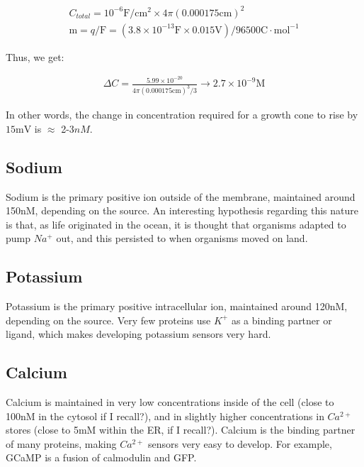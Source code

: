 \documentclass[12pt]{amsart}
\begin{document}
\bigskip

\begin{equation} \label{eq8}
\begin{split}
C_{total} = 10^{-6} \mathrm{F}/\mathrm{cm}^2 \times 4\pi (0.000175\mathrm{cm})^2 \\
\mathrm{m} = q/\mathrm{F} = (3.8 \times 10^{-13}\mathrm{F} \times 0.015\mathrm{V}) / 96500 \mathrm{C}\cdot\mathrm{mol}^{-1}
\end{split}
\end{equation}



\bigskip

    Thus, we get:

    \bigskip

\begin{equation} \label{eq8}
\begin{split}
\Delta C = \frac{5.99\times10^{-20}}{4\pi (0.000175\mathrm{cm})^3 /3} \rightarrow 2.7 \times10^{-9} \mathrm{M}
\end{split}
\end{equation}

\bigskip

In other words, the change in concentration required for a growth cone to rise by $15\mathrm{mV}$ is $\approx$ 2-3$nM$.  



\subsection{Sodium} Sodium is the primary positive ion outside of the membrane, maintained around 150nM, depending on the source. An interesting hypothesis regarding this nature is that, as life originated in the ocean, it is thought that organisms adapted to pump $Na^+$ out, and this persisted to when organisms moved on land.  
\subsection{Potassium} Potassium is the primary positive intracellular ion, maintained around 120nM, depending on the source. Very few proteins use $K^+$ as a binding partner or ligand, which makes developing potassium sensors very hard. 
\subsection{Calcium} Calcium is maintained in very low concentrations inside of the cell (close to 100nM in the cytosol if I recall?), and in slightly higher concentrations in $Ca^{2+}$ stores (close to 5mM within the ER, if I recall?). Calcium is the binding partner of many proteins, making $Ca^{2+}$ sensors very easy to develop. For example, GCaMP is a fusion of calmodulin and GFP. 
\end{document}
